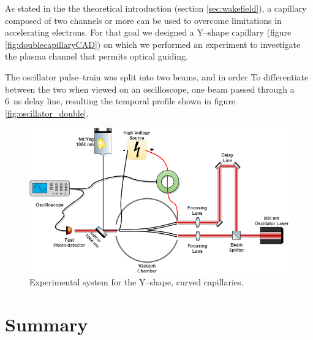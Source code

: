 \documentclass[justified,nofonts,nobib,openany]{tufte-book}
\begin{document}
As stated in the the theoretical introduction (section \ref{sec:wakefield}), a capillary composed of two channels or more can be used to overcome limitations in accelerating electrons. For that goal we designed a Y--shape capillary (figure \ref{fig:doublecapillaryCAD}) on which we performed an experiment to investigate the plasma channel that permits optical guiding.

The oscillator pulse--train was split into two beams, and in order To differentiate between the two when viewed on an oscilloscope, one beam passed through a \SI{6}{\ns} delay line, resulting the temporal profile shown in figure \ref{fig:oscillator_double}.

\begin{figure}
    \centering
    \includegraphics[width=\textwidth]{Curved capillaries/figures-double capillary.png}
    \caption{Experimental system for the Y--shape, curved capillaries.}
    \label{fig:twostage_system}
\end{figure}


\chapter{Summary}\label{chap:summary}

\printbibliography
\end{document}
